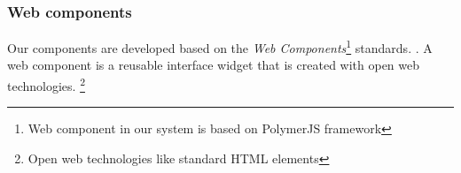 \subsubsection{Web components}
Our components are developed based on the \emph{Web Components}\footnote{ Web component in our system is based on PolymerJS framework} standards. \cite{website:Mozilla-Developer}. A web component is a reusable interface widget that is created with open web technologies. \footnote{Open web technologies like standard HTML elements} 